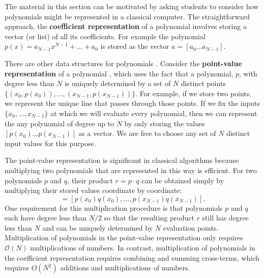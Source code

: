\documentclass[prb,preprint]{revtex4}
\begin{document}
	The material in this section can be motivated by asking students to consider how polynomials might be represented in a classical computer. 
	The straightforward approach, the \textbf{coefficient representation} of a polynomial \cite{cormen2009algorithms_ch30} involves storing a vector (or list) of all its coefficients. For example the polynomial $p(x) = a_{N-1}x^{N-1} + ... + a_0$ is stored as the vector $a = [a_0 ... a_{N-1}]$. 
	
	There are other data structures for polynomials \cite{cormen2009algorithms_ch30}. Consider the \textbf{point-value representation} of a polynomial \cite{cormen2009algorithms_ch30}, which uses the fact that a polynomial, $p$, with degree less than $N$ is uniquely determined by a set of $N$ distinct points $\{(x_0,p(x_0)), ..., (x_{N-1},p(x_{N-1}))\}$. For example, if we store two points, we represent the unique line that passes through those points. If we fix the inputs $\{x_0, ..., x_{N-1}\}$ at which we will evaluate every polynomial, then we can represent the any polynomial of degree up to $N$ by only storing the values $[p(x_0)...p(x_{N-1})]$ as a vector. We are free to choose any set of $N$ distinct input values for this purpose.
	
	The point-value representation is significant in classical algorithms because multiplying two polynomials that are represented in this way is efficient. For two polynomials $p$ and $q$, their product $r = p \cdot q$ can be obtained simply by multiplying their stored values coordinate by coordinate:
	\begin{equation}
	[r(x_0), \ldots, r(x_{N-1})] = [p(x_0)q(x_0), \ldots, p(x_{N-1})q(x_{N-1})].
	\end{equation}
	One requirement for this multiplication procedure is that polynomials $p$ and $q$ each have degree less than $N/2$ so that the resulting product $r$ still has degree less than $N$ and can be uniquely determined by $N$ evaluation points. Multiplication of polynomials in the point-value representation only requires $\mathcal{O}(N)$ multiplications of numbers. In contrast, multiplication of polynomials in the coefficient representation requires combining and summing cross-terms, which requires $O(N^2)$ additions and multiplications of numbers.
	
\end{document}
